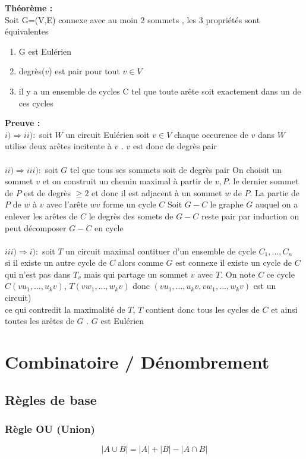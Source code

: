\documentclass{report}
\newcommand{\preuve}{\textcolor[rgb]{0.95,0.25,0}{Preuve : }}
\newcommand{\Preuve}{\textbf{\preuve}}
\newcommand{\thm}{\textcolor[rgb]{0,0.4,1}{Théorème : }}
\newcommand{\THM}{\textbf{\thm}}
\begin{document}
\THM\\
Soit G=(V,E) connexe avec au moin 2 sommets , les 3 propriétés sont équivalentes\\
\begin{enumerate}
	\item G est Eulérien
	\item degrès($v$) est pair pour tout $v \in V$
	\item il y a un ensemble de cycles C tel que toute arête soit exactement dans un de ces cycles\\
\end{enumerate}
\Preuve\\
\textbf{$i)\Rightarrow ii) :$} soit $W$ un circuit Eulérien soit $v \in V$ chaque occurence de $v$ dans $W$ utilise deux arêtes incitente à $v$ . $v$ est donc de degrès pair\\
\\\textbf{$ii)\Rightarrow iii) :$} soit $G$ tel que tous ses sommets soit de degrès pair On choisit un sommet $v$ et on construit un chemin maximal à partir de $v,P$. le dernier sommet de $P$ est de degrès $\geq 2$ et donc il est adjacent à un sommet $w$ de $P$. La partie de $P$ de $w$ à $v$ avec l'arête $wv$ forme un cycle $C$ Soit $G-C$ le graphe $G$ auquel on a enlever les arêtes de $C$ le degrès des somets de $G-C$ reste pair par induction on peut décomposer $G-C$ en cycle\\
\\\textbf{$iii)\Rightarrow i) :$} soit $T$ un circuit maximal contituer d'un ensemble de cycle $C_1,...,C_n$\\
si il existe un autre cycle de $C$ alors comme $G$ est connexe il existe un cycle de $C$ qui n'est pas dans $T_v$ mais qui partage un sommet $v$ avec $T$. On note $C$ ce cycle\\ $C(vu_1,...,u_kv)$, $T(vw_1,...,w_kv)$ donc  $(vu_1,...,u_kv,vw_1,...,w_kv)$ est un circuit)\\
ce qui contredit la maximalité de $T$, $T$ contient donc tous les cycles de $C$ et ainsi toutes les arêtes de $G$ . $G$ est Eulérien\\

\section{Combinatoire / Dénombrement}
\subsection{Règles de base}
\subsubsection{Règle OU (Union)}
$$\left|A \cup B\right|=|A|+|B|-|A\cap B|$$
\end{document}
